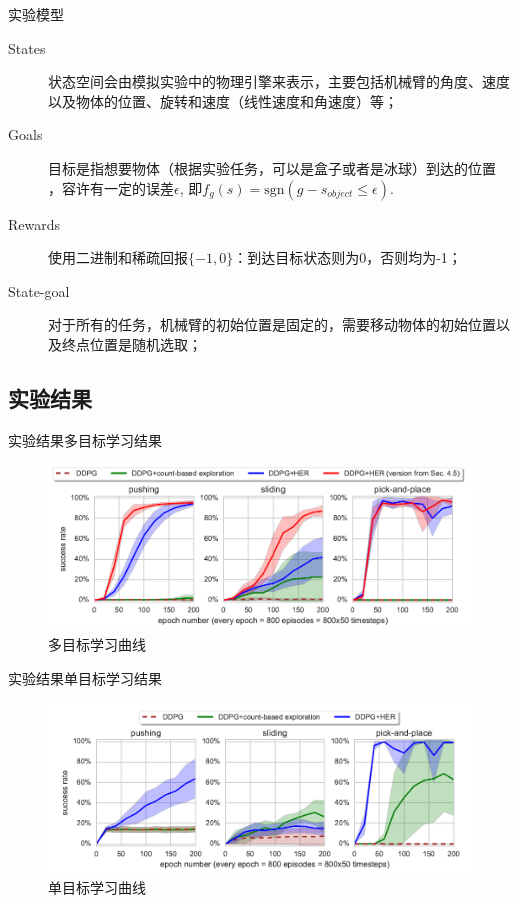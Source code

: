 \documentclass[10pt]{beamer}
\newcommand{\sgn}{\textrm{sgn}}
\begin{document}
	\begin{frame}{实验}{模型}
		\begin{description}
			\item[States] 状态空间会由模拟实验中的物理引擎来表示，主要包括机械臂的角度、速度以及物体的位置、旋转和速度（线性速度和角速度）等；
			
			\item[Goals] 目标是指想要物体（根据实验任务，可以是盒子或者是冰球）到达的位置 ，容许有一定的误差$\epsilon$, 即$f_g(s) = \sgn(g-s_{object} \leq \epsilon)$. 
			
			\item[Rewards] 使用二进制和稀疏回报$\{−1,0\}$：到达目标状态则为0，否则均为-1；
			
			\item[State-goal] 对于所有的任务，机械臂的初始位置是固定的，需要移动物体的初始位置以及终点位置是随机选取；
			
		\end{description}
	\end{frame}
	
	\subsection{实验结果}
	
	\begin{frame}{实验结果}{多目标学习结果}
		\begin{figure}
			\centering
			\includegraphics[width=0.9\linewidth]{pictures/multi-goal-expr}
			\caption{多目标学习曲线}
			\label{fig:multi-goal-expr}
		\end{figure}
		
	\end{frame}

	\begin{frame}{实验结果}{单目标学习结果}
		\begin{figure}
			\centering
			\includegraphics[width=0.9\linewidth]{pictures/single-goal-expr}
			\caption{单目标学习曲线}
			\label{fig:single-goal-expr}
		\end{figure}
		
	\end{frame}
\end{document}

